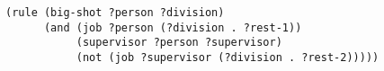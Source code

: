 \documentclass[a4paper,12pt]{article}
\begin{document}
\begin{lstlisting}
(rule (big-shot ?person ?division)
      (and (job ?person (?division . ?rest-1))
           (supervisor ?person ?supervisor)
           (not (job ?supervisor (?division . ?rest-2)))))
\end{lstlisting}
\end{document}
